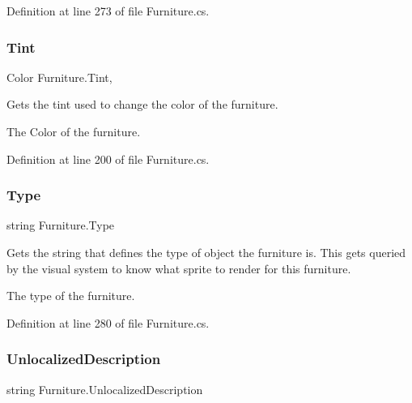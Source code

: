 Definition at line 273 of file Furniture.\+cs.

\mbox{\label{class_furniture_a41508df7e9308f8b1afaadbc73decb14}} 
\subsubsection{\texorpdfstring{Tint}{Tint}}
{\footnotesize\ttfamily Color Furniture.\+Tint\hspace{0.3cm}{\ttfamily [get]}, {\ttfamily [set]}}



Gets the tint used to change the color of the furniture. 

The Color of the furniture.

Definition at line 200 of file Furniture.\+cs.

\mbox{\label{class_furniture_a20ab8b51ecf342cf0463482bf2816de4}} 
\subsubsection{\texorpdfstring{Type}{Type}}
{\footnotesize\ttfamily string Furniture.\+Type\hspace{0.3cm}{\ttfamily [get]}}



Gets the string that defines the type of object the furniture is. This gets queried by the visual system to know what sprite to render for this furniture. 

The type of the furniture.

Definition at line 280 of file Furniture.\+cs.

\mbox{\label{class_furniture_aa9e0fe9e4a5b51d86a76d3e11f79f58a}} 
\subsubsection{\texorpdfstring{Unlocalized\+Description}{UnlocalizedDescription}}
{\footnotesize\ttfamily string Furniture.\+Unlocalized\+Description\hspace{0.3cm}{\ttfamily [get]}}




